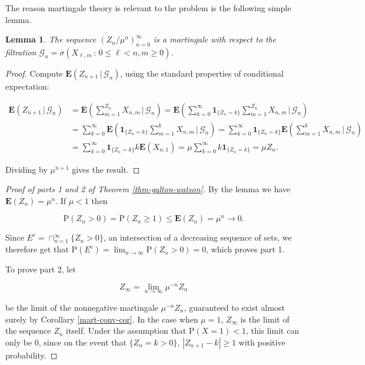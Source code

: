 \documentclass[11pt]{report}
\theoremstyle{plain}
\newtheorem{lem}[thm]{Lemma}
\theoremstyle{definition}
\begin{document}
The reason martingale theory is relevant to the problem is the following simple lemma.

\begin{lem}
The sequence $(Z_n/\mu^n)_{n=0}^\infty$ is a martingale with respect to the filtration $\mathcal{G}_n = \sigma(X_{\ell,m}\,:\, 0\le \ell< n, m\ge 0)$.
\end{lem}

\begin{proof}
Compute $\mathbf{E}\left(Z_{n+1}\,|\,\mathcal{G}_n\right)$, using the standard properties of conditional expectation:

\begin{align*}
\mathbf{E}\left(Z_{n+1}\,|\,\mathcal{G}_n\right) &= \mathbf{E}\left(\sum_{m=1}^{Z_{n}} X_{n,m}\,|\,\mathcal{G}_n\right)
=
\mathbf{E}\left( \sum_{k=0}^\infty  \mathbf{1}_{\{Z_n=k\}} \sum_{m=1}^{Z_{n}} X_{n,m}\,|\,\mathcal{G}_n\right)
\\
&= \sum_{k=0}^\infty
\mathbf{E}\left( \mathbf{1}_{\{Z_n=k\}} \sum_{m=1}^{k} X_{n,m}\,|\,\mathcal{G}_n\right)
= \sum_{k=0}^\infty \mathbf{1}_{\{Z_n=k\}}
\mathbf{E}\left(  \sum_{m=1}^{k} X_{n,m}\,|\,\mathcal{G}_n\right) \\
&=
\sum_{k=0}^\infty \mathbf{1}_{\{Z_n=k\}} k \mathbf{E}(X_{n,1}) = \mu \sum_{k=0}^\infty k \mathbf{1}_{\{Z_n=k\}} = \mu Z_n.
\end{align*}

Dividing by $\mu^{n+1}$ gives the result.
\end{proof}

\begin{proof}[Proof of parts 1 and 2 of Theorem \ref{thm-galton-watson}]
By the lemma we have $\mathbf{E}(Z_n)=\mu^n$. If $\mu<1$ then

\[
\mathrm{P}(Z_n>0)=\mathrm{P}(Z_n\ge 1)\le \mathbf{E}(Z_n) = \mu^n \to 0.
\]

Since $E^c = \cap_{n=1}^\infty \{ Z_n>0 \}$, an intersection of a decreasing sequence of sets, we therefore get that $\mathrm{P}(E^c)=\displaystyle\lim_{n\to\infty} \mathrm{P}(Z_n>0)=0$, which proves part 1.

To prove part 2, let

\[
Z_\infty = \lim_{n\to\infty} \mu^{-n} Z_n
\]

be the limit of the nonnegative martingale $\mu^{-n} Z_n$, guaranteed to exist almost surely by Corollary \ref{mart-conv-cor}. In the case when $\mu=1$, $Z_\infty$ is the limit of the sequence $Z_n$ itself. Under the assumption that $\mathrm{P}(X=1)<1$, this limit can only be $0$, since on the event that $\{Z_n=k>0\}$, $|Z_{n+1}-k|\ge 1$ with positive probability.
\end{proof}
\end{document}
